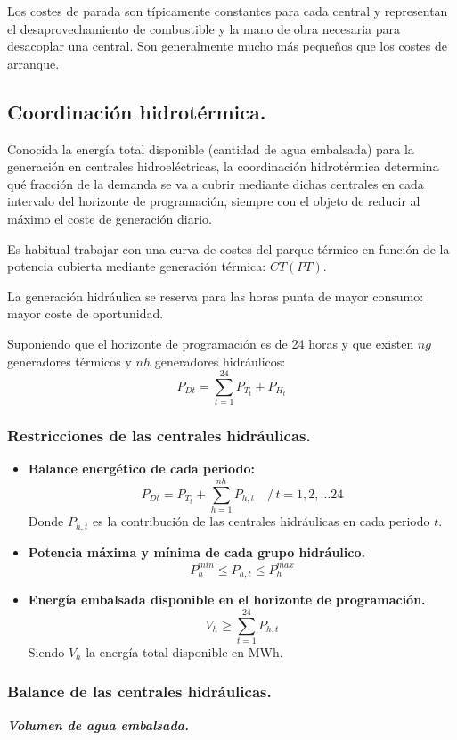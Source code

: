 			Los costes de parada son típicamente constantes para cada central y representan el desaprovechamiento de combustible y
			la mano de obra necesaria para desacoplar una central. Son generalmente mucho más pequeños que los costes de arranque.
			
		\subsection{Coordinación hidrotérmica.}
			Conocida la energía total disponible (cantidad de agua embalsada) para la generación
			en centrales hidroeléctricas, la coordinación hidrotérmica determina qué fracción de
			la demanda se va a cubrir mediante dichas centrales en cada intervalo del horizonte
			de programación, siempre con el objeto de reducir al máximo el coste de
			generación diario.
			
			
			Es habitual trabajar con una curva de costes del parque térmico en función de la
			potencia cubierta mediante generación térmica: $CT(PT)$.
			
			
			La generación hidráulica se reserva para las horas punta de mayor consumo: mayor coste de
			oportunidad.
			
			
			Suponiendo que el horizonte de programación es de 24 horas y que existen $ng$
			generadores térmicos y $nh$ generadores hidráulicos:
			\[P_{Dt} = \sum_{t=1}^{24} P_{T_t} + P_{H_t}\]
			
			\subsubsection{Restricciones de las centrales hidráulicas.}
				\begin{itemize}
					\item \textbf{Balance energético de cada periodo:}
						\[P_{Dt} = P_{T_t} + \sum_{h=1}^{nh} P_{h,t}\quad/\,t=1,2,\dots24\]
						Donde $P_{h,t}$ es la contribución de las centrales hidráulicas en cada periodo $t$.
					
					\item \textbf{Potencia máxima y mínima de cada grupo hidráulico.}
						\[P_h^{min} \leq P_{h,t} \leq P_h^{max}\]
						
					\item \textbf{Energía embalsada disponible en el horizonte de programación.}
						\[V_h \geq \sum_{t=1}^{24} P_{h,t}\]
						Siendo $V_h$ la energía total disponible en MWh.
				\end{itemize}
				
			\subsubsection{Balance de las centrales hidráulicas.}
				\textbf{\textit{Volumen de agua embalsada.}}
				
